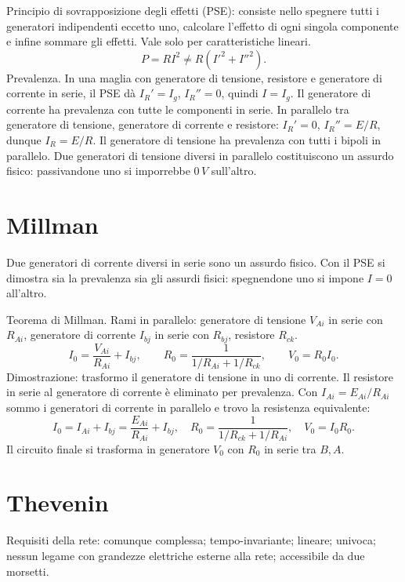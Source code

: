 \documentclass[11pt,a4paper]{article}
\newcommand{\pagina}[2]{\clearpage\section*{#2}}
\begin{document}
Principio di sovrapposizione degli effetti (PSE): consiste nello spegnere tutti i generatori indipendenti eccetto uno, calcolare l'effetto di ogni singola componente e infine sommare gli effetti. Vale solo per caratteristiche lineari.
\[P=RI^2\ne R(I'^2+I''^2).\]
Prevalenza. In una maglia con generatore di tensione, resistore e generatore di corrente in serie, il PSE dà $I_R'=I_g$, $I_R''=0$, quindi $I=I_g$. Il generatore di corrente ha prevalenza con tutte le componenti in serie. In parallelo tra generatore di tensione, generatore di corrente e resistore: $I_R'=0$, $I_R''=E/R$, dunque $I_R=E/R$. Il generatore di tensione ha prevalenza con tutti i bipoli in parallelo. Due generatori di tensione diversi in parallelo costituiscono un assurdo fisico: passivandone uno si imporrebbe $0\,V$ sull'altro.
\pagina{12}{Millman}
Due generatori di corrente diversi in serie sono un assurdo fisico. Con il PSE si dimostra sia la prevalenza sia gli assurdi fisici: spegnendone uno si impone $I=0$ all'altro.

Teorema di Millman. Rami in parallelo: generatore di tensione $V_{Ai}$ in serie con $R_{Ai}$, generatore di corrente $I_{bj}$ in serie con $R_{bj}$, resistore $R_{ck}$.
\[I_0=\frac{V_{Ai}}{R_{Ai}}+I_{bj},\qquad R_0=\frac1{1/R_{Ai}+1/R_{ck}},\qquad V_0=R_0I_0.\]
Dimostrazione: trasformo il generatore di tensione in uno di corrente. Il resistore in serie al generatore di corrente è eliminato per prevalenza. Con $I_{Ai}=E_{Ai}/R_{Ai}$ sommo i generatori di corrente in parallelo e trovo la resistenza equivalente:
\[I_0=I_{Ai}+I_{bj}=\frac{E_{Ai}}{R_{Ai}}+I_{bj},\quad R_0=\frac1{1/R_{ck}+1/R_{Ai}},\quad V_0=I_0R_0.\]
Il circuito finale si trasforma in generatore $V_0$ con $R_0$ in serie tra $B,A$.
\pagina{13}{Thevenin}
Requisiti della rete: comunque complessa; tempo-invariante; lineare; univoca; nessun legame con grandezze elettriche esterne alla rete; accessibile da due morsetti.
\end{document}

